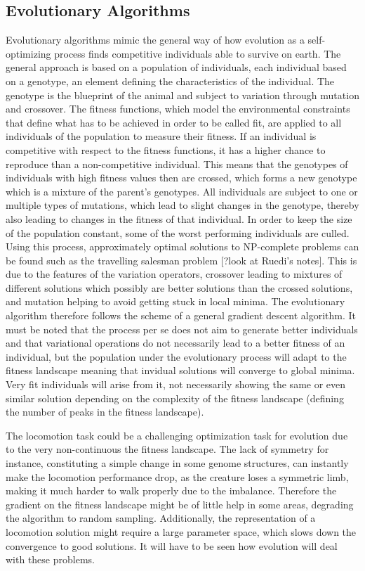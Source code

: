 \documentclass[main]{subfiles}
\begin{document}
\subsection{Evolutionary Algorithms}

Evolutionary algorithms mimic the general way of how evolution as a self-optimizing process finds competitive individuals able to survive on earth. The general approach is based on a population of individuals, each individual based on a genotype, an element defining the characteristics of the individual. The genotype is the blueprint of the animal and subject to variation through mutation and crossover. The fitness functions, which model the environmental constraints that define what has to be achieved in order to be called fit, are applied to all individuals of the population to measure their fitness. If an individual is competitive with respect to the fitness functions, it has a higher chance to reproduce than a non-competitive individual. This means that the genotypes of individuals with high fitness values then are crossed, which forms a new genotype which is a mixture of the parent's genotypes. All individuals are subject to one or multiple types of mutations, which lead to slight changes in the genotype, thereby also leading to changes in the fitness of that individual. In order to keep the size of the population constant, some of the worst performing individuals are culled. Using this process, approximately optimal solutions to NP-complete problems can be found such as the travelling salesman problem [?look at Ruedi's notes]. This is due to the features of the variation operators, crossover leading to mixtures of different solutions which possibly are better solutions than the crossed solutions, and mutation helping to avoid getting stuck in local minima. The evolutionary algorithm therefore follows the scheme of a general gradient descent algorithm. It must be noted that the process per se does not aim to generate better individuals and that variational operations do not necessarily lead to a better fitness of an individual, but the population under the evolutionary process will adapt to the fitness landscape meaning that invidual solutions will converge to global minima. Very fit individuals will arise from it, not necessarily showing the same or even similar solution depending on the complexity of the fitness landscape (defining the number of peaks in the fitness landscape). 

The locomotion task could be a challenging optimization task for evolution due to the very non-continuous the fitness landscape. The lack of symmetry for instance, constituting a simple change in some genome structures, can instantly make the locomotion performance drop, as the creature loses a symmetric limb, making it much harder to walk properly due to the imbalance. Therefore the gradient on the fitness landscape might be of little help in some areas, degrading the algorithm to random sampling. Additionally, the representation of a locomotion solution might require a large parameter space, which slows down the convergence to good solutions. It will have to be seen how evolution will deal with these problems.
\end{document}
